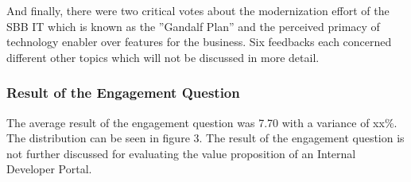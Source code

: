\documentclass[a4paper,12pt]{article}
\begin{document}
    And finally, there were two critical votes about the modernization effort of the SBB IT which is known as the
    ''Gandalf Plan'' and the perceived primacy of technology enabler over features for the business.
    Six feedbacks each concerned different other topics which will not be discussed in more detail.

    \subsubsection{Result of the Engagement Question}
    \label{sssec:rengque}
    The average result of the engagement question was 7.70 with a variance of xx\%.
    The distribution can be seen in figure 3.
    The result of the engagement question is not further discussed for evaluating the value proposition of an Internal Developer Portal.
\end{document}
